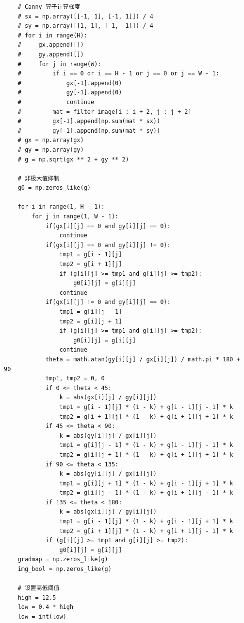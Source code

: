 \documentclass{article}
\begin{document}
\begin{lstlisting}
    # Canny 算子计算梯度
    # sx = np.array([[-1, 1], [-1, 1]]) / 4
    # sy = np.array([[1, 1], [-1, -1]]) / 4
    # for i in range(H):
    #     gx.append([])
    #     gy.append([])
    #     for j in range(W):
    #         if i == 0 or i == H - 1 or j == 0 or j == W - 1:
    #             gx[-1].append(0)
    #             gy[-1].append(0)
    #             continue
    #         mat = filter_image[i : i + 2, j : j + 2]
    #         gx[-1].append(np.sum(mat * sx))
    #         gy[-1].append(np.sum(mat * sy))
    # gx = np.array(gx)
    # gy = np.array(gy)
    # g = np.sqrt(gx ** 2 + gy ** 2)

    # 非极大值抑制
    g0 = np.zeros_like(g)

    for i in range(1, H - 1):
        for j in range(1, W - 1):
            if(gx[i][j] == 0 and gy[i][j] == 0):
                continue
            if(gx[i][j] == 0 and gy[i][j] != 0):
                tmp1 = g[i - 1][j]
                tmp2 = g[i + 1][j]
                if (g[i][j] >= tmp1 and g[i][j] >= tmp2):
                    g0[i][j] = g[i][j]
                continue
            if(gx[i][j] != 0 and gy[i][j] == 0):
                tmp1 = g[i][j - 1]
                tmp2 = g[i][j + 1]
                if (g[i][j] >= tmp1 and g[i][j] >= tmp2):
                    g0[i][j] = g[i][j]
                continue
            theta = math.atan(gy[i][j] / gx[i][j]) / math.pi * 180 + 90
            tmp1, tmp2 = 0, 0
            if 0 <= theta < 45:
                k = abs(gx[i][j] / gy[i][j])
                tmp1 = g[i - 1][j] * (1 - k) + g[i - 1][j - 1] * k
                tmp2 = g[i + 1][j] * (1 - k) + g[i + 1][j + 1] * k
            if 45 <= theta < 90:
                k = abs(gy[i][j] / gx[i][j])
                tmp1 = g[i][j - 1] * (1 - k) + g[i - 1][j - 1] * k
                tmp2 = g[i][j + 1] * (1 - k) + g[i + 1][j + 1] * k
            if 90 <= theta < 135:
                k = abs(gy[i][j] / gx[i][j])
                tmp1 = g[i][j + 1] * (1 - k) + g[i - 1][j + 1] * k
                tmp2 = g[i][j - 1] * (1 - k) + g[i + 1][j - 1] * k
            if 135 <= theta < 180:
                k = abs(gx[i][j] / gy[i][j])
                tmp1 = g[i - 1][j] * (1 - k) + g[i - 1][j + 1] * k
                tmp2 = g[i + 1][j] * (1 - k) + g[i + 1][j - 1] * k
            if (g[i][j] >= tmp1 and g[i][j] >= tmp2):
                g0[i][j] = g[i][j]
    gradmap = np.zeros_like(g)
    img_bool = np.zeros_like(g)

    # 设置高低阈值
    high = 12.5
    low = 0.4 * high
    low = int(low)


\end{lstlisting}
\end{document}
